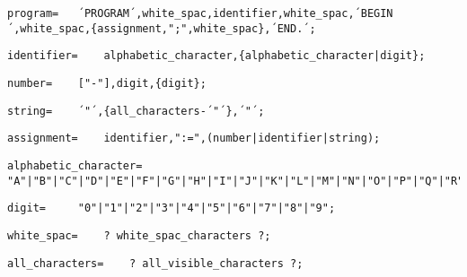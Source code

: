 \documentclass{article}
\begin{document}
    \begin{lstlisting}[mathescape=true]
     program= 	´PROGRAM´,white_spac,identifier,white_spac,´BEGIN´,white_spac,{assignment,";",white_spac},´END.´;
    \end{lstlisting}
    
    \begin{lstlisting}[mathescape=true]
     identifier= 	alphabetic_character,{alphabetic_character|digit};
    \end{lstlisting}
    
    \begin{lstlisting}[mathescape=true]
     number= 	["-"],digit,{digit};
    \end{lstlisting}
    
    \begin{lstlisting}[mathescape=true]
     string= 	´"´,{all_characters-´"´},´"´;
    \end{lstlisting}
    
    \begin{lstlisting}[mathescape=true]
     assignment= 	identifier,":=",(number|identifier|string);
    \end{lstlisting}
    
    \begin{lstlisting}[mathescape=true]
     alphabetic_character= 	"A"|"B"|"C"|"D"|"E"|"F"|"G"|"H"|"I"|"J"|"K"|"L"|"M"|"N"|"O"|"P"|"Q"|"R"|"S"|"T"|"U"|"V"|"W"|"X"|"Y"|"Z";
    \end{lstlisting}
    
    \begin{lstlisting}[mathescape=true]
     digit= 	"0"|"1"|"2"|"3"|"4"|"5"|"6"|"7"|"8"|"9";
    \end{lstlisting}
    
    \begin{lstlisting}[mathescape=true]
     white_spac= 	? white_spac_characters ?;
    \end{lstlisting}
    
    \begin{lstlisting}[mathescape=true]
     all_characters= 	? all_visible_characters ?;
    \end{lstlisting}
    
\end{document}
